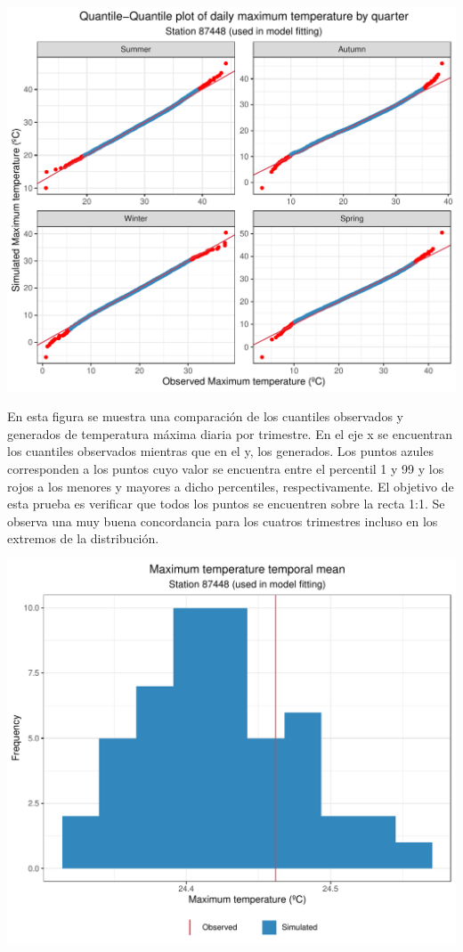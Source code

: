 \documentclass[
]{article}
\begin{document}
\begin{center}\includegraphics{Webinario_Generador_files/figure-latex/unnamed-chunk-40-1} \end{center}

En esta figura se muestra una comparación de los cuantiles observados y generados de temperatura máxima diaria por trimestre. En el eje x se encuentran los cuantiles observados mientras que en el y, los generados. Los puntos azules corresponden a los puntos cuyo valor se encuentra entre el percentil 1 y 99 y los rojos a los menores y mayores a dicho percentiles, respectivamente. El objetivo de esta prueba es verificar que todos los puntos se encuentren sobre la recta 1:1. Se observa una muy buena concordancia para los cuatros trimestres incluso en los extremos de la distribución.

\begin{center}\includegraphics{Webinario_Generador_files/figure-latex/unnamed-chunk-41-1} \end{center}
\end{document}
